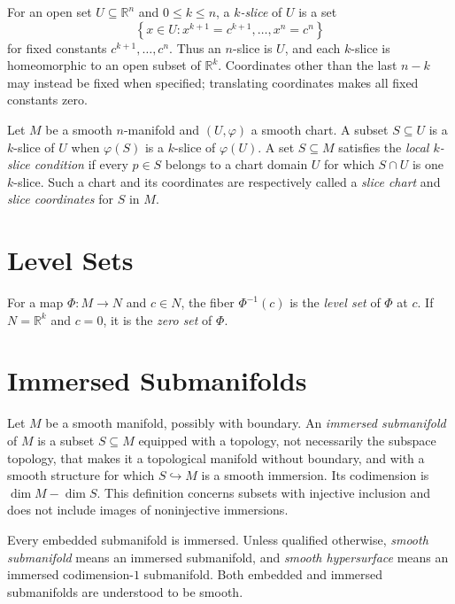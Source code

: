 \begin{definition}
\label{def:5-29-extra-1}
\leanok
For an open set $U\subseteq\mathbb R^n$ and $0\leq k\leq n$, a
\emph{$k$-slice} of $U$ is a set
\[
 \left\{x\in U:x^{k+1}=c^{k+1},\ldots,x^n=c^n\right\}
\]
for fixed constants $c^{k+1},\ldots,c^n$. Thus an $n$-slice is $U$, and each
$k$-slice is homeomorphic to an open subset of $\mathbb R^k$. Coordinates
other than the last $n-k$ may instead be fixed when specified; translating
coordinates makes all fixed constants zero.

Let $M$ be a smooth $n$-manifold and $(U,\varphi)$ a smooth chart. A subset
$S\subseteq U$ is a $k$-slice of $U$ when $\varphi(S)$ is a $k$-slice of
$\varphi(U)$. A set $S\subseteq M$ satisfies the \emph{local $k$-slice
condition} if every $p\in S$ belongs to a chart domain $U$ for which $S\cap U$
is one $k$-slice. Such a chart and its coordinates are respectively called a
\emph{slice chart} and \emph{slice coordinates} for $S$ in $M$.
\end{definition}



\section{Level Sets}

\begin{definition}
\label{def:5-30-extra-1}
\mathlibok
For a map $\Phi:M\to N$ and $c\in N$, the fiber $\Phi^{-1}(c)$ is the
\emph{level set} of $\Phi$ at $c$. If $N=\mathbb R^k$ and $c=0$, it is the
\emph{zero set} of $\Phi$.
\end{definition}


\section{Immersed Submanifolds}

\begin{definition}
\label{def:5-31-extra-1}
\leanok
Let $M$ be a smooth manifold, possibly with boundary. An \emph{immersed
submanifold} of $M$ is a subset $S\subseteq M$ equipped with a topology, not
necessarily the subspace topology, that makes it a topological manifold without
boundary, and with a smooth structure for which $S\hookrightarrow M$ is a
smooth immersion. Its codimension is $\dim M-\dim S$. This definition concerns
subsets with injective inclusion and does not include images of noninjective
immersions.

Every embedded submanifold is immersed. Unless qualified otherwise,
\emph{smooth submanifold} means an immersed submanifold, and \emph{smooth
hypersurface} means an immersed codimension-$1$ submanifold. Both embedded and
immersed submanifolds are understood to be smooth.
\end{definition}

